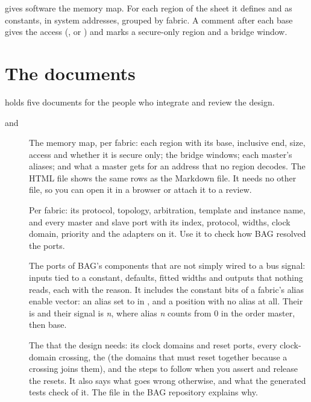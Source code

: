  gives software the memory map. For each region of the
 sheet it defines  and 
as  constants, in system addresses, grouped by fabric. A comment after each
base gives the access (,  or ) and marks a secure-only region
and a bridge window.



\section{The documents}
\label{sec:docs}

 holds five documents for the people who integrate and review the design.



\begin{description}
\item[ and ] The memory map, per fabric: each
  region with its base, inclusive end, size, access and whether it is secure only; the
  bridge windows; each master's aliases; and what a master gets for an address that no
  region decodes. The HTML file shows the same rows as the Markdown file. It needs no
  other file, so you can open it in a browser or attach it to a review.
\item[] Per fabric: its protocol, topology, arbitration, template
  and instance name, and every master and slave port with its index, protocol, widths,
  clock domain, priority and the adapters on it. Use it to check how BAG resolved the
  ports.
\item[] The ports of BAG's components that are not simply wired to a
  bus signal: inputs tied to a constant, defaults, fitted widths and outputs that nothing
  reads, each with the reason. It includes the constant bits of a fabric's alias enable
  vector: an alias set to  in , and a position with no
  alias at all. Their
   is \code{-} and their signal is \code{alias_en_i[}\emph{n}\code{]}, where
  alias \emph{n} counts from 0 in the order master, then base.
\item[] The  that the design needs: its clock
  domains and reset ports, every clock-domain crossing, the  (the
  domains that must reset together because a crossing joins them), and the steps to
  follow when you assert and release the resets. It also says what goes wrong otherwise,
  and what the generated tests check of it. The file  in
  the BAG repository explains why.
\end{description}

